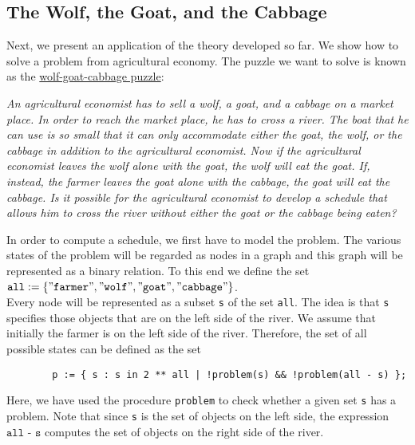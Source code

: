 \subsection{The Wolf, the Goat, and the Cabbage}
Next, we present an application of the theory developed so far.  We show how to solve a problem from
agricultural economy.  The puzzle we want to solve is known as the 
\href{http://jeux.lulu.pagesperso-orange.fr/html/anglais/loupChe/loupChe1.htm}{wolf-goat-cabbage puzzle}:  
\vspace*{0.3cm}

\begin{minipage}[c]{14cm}
{\sl
An agricultural economist has to sell a wolf, a goat, and a cabbage on a market place.  In order to
reach the market place, he has to cross a river.  The boat that he can use is so small that it can
only accommodate either the goat, the wolf, or the cabbage in addition to the agricultural economist.
Now if the agricultural economist leaves the wolf alone with the goat, the wolf will eat the goat.
If, instead, the farmer leaves the goat alone with the cabbage, the goat will eat the cabbage.
Is it possible for the agricultural economist to develop a schedule that allows him to cross the river
without either the goat or the cabbage being eaten?
}
\end{minipage}
\vspace*{0.3cm}

\noindent
In order to compute a schedule, we first have to model the problem.  The various states of the problem will
be regarded as nodes in a graph and this graph will be represented as a binary relation.
To this end we define the set
\\[0.2cm]
\hspace*{1.3cm} 
$\texttt{all} := \{ \squote{farmer}, \squote{wolf}, \squote{goat},\squote{cabbage} \}$.
\\[0.2cm]
Every node will be represented as a subset \texttt{s} of the set \texttt{all}.  The idea is that \texttt{s}
specifies those objects that are on the left side of the river.  We assume that initially the farmer
is on the left side of the river. 
Therefore, the set of all possible states can be defined as the set
\begin{verbatim}
        p := { s : s in 2 ** all | !problem(s) && !problem(all - s) };
\end{verbatim}
Here, we have used the procedure \texttt{problem} to check whether a given set \texttt{s} has a problem. 
Note that since \texttt{s} is the set of objects on the left side, the expression $\texttt{all - s}$
computes the set of objects on the right side of the river.

